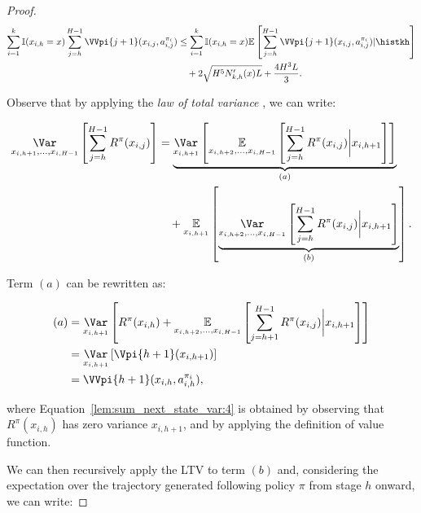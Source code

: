 \begin{proof}
\begin{align}
    \begin{split}
    \label{lem:sum_next_state_var:2}
    \sum_{i=1}^k \mathbb{I}(x_{i,h}=x) \sum_{j=h}^{H-1} \VVpi{j+1} (x_{i,j}, a_{i,j}^{\pi_i}) &\le \sum_{i=1}^k \mathbb{I}(x_{i,h}=x) \mathbb{E} \left[ \sum_{j=h}^{H-1} \VVpi{j+1} (x_{i,j}, a_{i,j}^{\pi_i}) | \histkh \right] \\ 
    &\quad + 2\sqrt{H^5 N'_{k,h}(x) L} + \frac{4H^3 L}{3}. 
    \end{split}
\end{align}

Observe that by applying the \emph{law of total variance} \citep[LTV, see, \eg Theorem 9.5.5 of][]{blitzstein2019}, we can write:

\begin{align}
    \begin{split}
    \label{lem:sum_next_state_var:3}
    \underset{x_{i,h+1}, \ldots, x_{i, H-1}}{\Var} \left[ \sum_{j=h}^{H-1} R^\pi (x_{i,j}) \right] &= \underbrace{\underset{x_{i,h+1}}{\Var}\left[ \underset{x_{i,h+2}, \ldots, x_{i,H-1}}{\mathbb{E}} \left[ \sum_{j=h}^{H-1} R^\pi (x_{i,j}) \bigg| x_{i,h+1} \right] \right]}_{(a)} \\
    &\quad + \underset{x_{i,h+1}}{\mathbb{E}} \left[ \underbrace{\underset{x_{i,h+2}, \ldots, x_{i,H-1}}{\Var} \left[ \sum_{j=h}^{H-1} R^\pi (x_{i,j}) \bigg| x_{i,h+1} \right]}_{(b)} \right].
    \end{split}
\end{align}

Term $(a)$ can be rewritten as:

\begin{align}
    (a) &= \underset{x_{i,h+1}}{\Var} \left[ R^\pi (x_{i,h}) + \underset{x_{i,h+2}, \ldots, x_{i,H-1}}{\mathbb{E}} \left[ \sum_{j=h+1}^{H-1} R^\pi (x_{i,j}) \bigg| x_{i,h+1} \right] \right] \nonumber \\
    &= \underset{x_{i,h+1}}{\Var} \left[ \Vpi{h+1} (x_{i, h+1}) \right] \label{lem:sum_next_state_var:4} \\
    &= \VVpi{h+1}(x_{i,h}, a_{i,h}^{\pi_i}),
\end{align}

where Equation~\eqref{lem:sum_next_state_var:4} is obtained by observing that $R^\pi (x_{i,h})$ has zero variance \wrt $x_{i,h+1}$, and by applying the definition of value function.

We can then recursively apply the LTV to term $(b)$ and, considering the expectation over the trajectory generated following policy $\pi$ from stage $h$ onward, we can write:


\end{proof}
